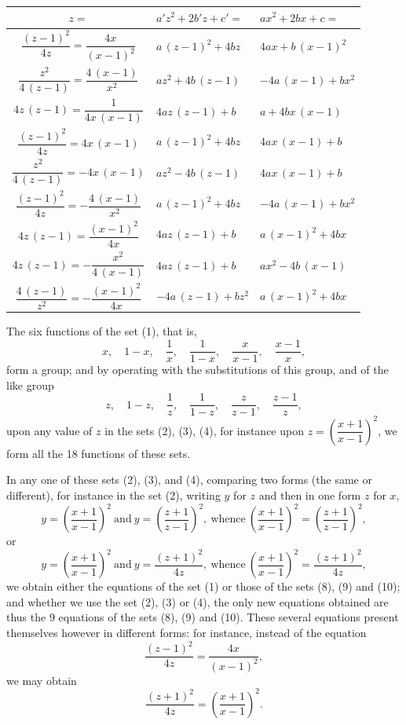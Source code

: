 \documentclass[12pt,a4paper,oneside]{book}
\theoremstyle{plain}
\theoremstyle{definition}
\theoremstyle{remark}
\begin{document}
\begin{center}
\small
\begin{tabular}{|c|l|l|}
\hline
$z=$ & $a'z^2+2b'z+c'=$ & $ax^2+2bx+c=$\\
\hline
$\dfrac{(z-1)^2}{4z}=\dfrac{4x}{(x-1)^2}$ & $a\,(z-1)^2+4bz$ & $4ax+b\,(x-1)^2$\\
$\dfrac{z^2}{4\,(z-1)}=\dfrac{4\,(x-1)}{x^2}$ & $az^2+4b\,(z-1)$ & $-4a\,(x-1)+bx^2$\\
$4z\,(z-1)=\dfrac{1}{4x\,(x-1)}$ & $4az\,(z-1)+b$ & $a+4bx\,(x-1)$\\
\hline
$\dfrac{(z-1)^2}{4z}=4x\,(x-1)$ & $a\,(z-1)^2+4bz$ & $4ax\,(x-1)+b$\\
$\dfrac{z^2}{4\,(z-1)}=-4x\,(x-1)$ & $az^2-4b\,(z-1)$ & $4ax\,(x-1)+b$\\
$\dfrac{(z-1)^2}{4z}=-\dfrac{4\,(x-1)}{x^2}$ & $a\,(z-1)^2+4bz$ & $-4a\,(x-1)+bx^2$\\
\hline
$4z\,(z-1)=\dfrac{(x-1)^2}{4x}$ & $4az\,(z-1)+b$ & $a\,(x-1)^2+4bx$\\
$4z\,(z-1)=-\dfrac{x^2}{4\,(x-1)}$ & $4az\,(z-1)+b$ & $ax^2-4b\,(x-1)$\\
$\dfrac{4\,(z-1)}{z^2}=-\dfrac{(x-1)^2}{4x}$ & $-4a\,(z-1)+bz^2$ & $a\,(x-1)^2+4bx$\\
\hline
\end{tabular}
\end{center}
\normalsize

\smallskip

The six functions of the set (1), that is,
\[
x,\quad 1-x,\quad \frac{1}{x},\quad \frac{1}{1-x},\quad \frac{x}{x-1},\quad \frac{x-1}{x},
\]
form a group; and by operating with the substitutions of this group, and of the like group
\[
z,\quad 1-z,\quad \frac{1}{z},\quad \frac{1}{1-z},\quad \frac{z}{z-1},\quad \frac{z-1}{z},
\]
upon any value of $z$ in the sets (2), (3), (4), for instance upon $z=\left(\dfrac{x+1}{x-1}\right)^2$, we form all the 18 functions of these sets.

In any one of these sets (2), (3), and (4), comparing two forms (the same or different), for instance in the set (2), writing $y$ for $z$ and then in one form $z$ for $x$,
\[
y=\left(\frac{x+1}{x-1}\right)^2\ \text{and}\ 
y=\left(\frac{z+1}{z-1}\right)^2,\ \text{whence}\ 
\left(\frac{x+1}{x-1}\right)^2=\left(\frac{z+1}{z-1}\right)^2,
\]
or
\[
y=\left(\frac{x+1}{x-1}\right)^2\ \text{and}\ 
y=\frac{(z+1)^2}{4z},\ \text{whence}\ 
\left(\frac{x+1}{x-1}\right)^2=\frac{(z+1)^2}{4z},
\]
we obtain either the equations of the set (1) or those of the sets (8), (9) and (10); and whether we use the set (2), (3) or (4), the only new equations obtained are thus the 9 equations of the sets (8), (9) and (10). These several equations present themselves however in different forms: for instance, instead of the equation
\[
\frac{(z-1)^2}{4z}=\frac{4x}{(x-1)^2},
\]
we may obtain
\[
\frac{(z+1)^2}{4z}=\left(\frac{x+1}{x-1}\right)^2.
\]
\end{document}
